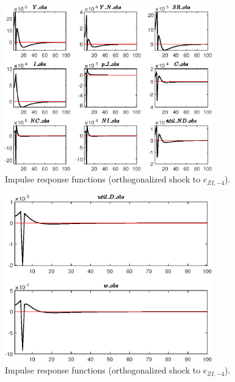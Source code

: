 \begin{figure}[H]
\centering 
\includegraphics[width=0.80\textwidth]{RBC_sectoral/graphs/RBC_sectoral_IRF_e_ZI_news1}
\caption{Impulse response functions (orthogonalized shock to ${e_{ZI,-4}}$).}\label{Fig:IRF:e_ZI_news:1}
\end{figure}
 
\begin{figure}[H]
\centering 
\includegraphics[width=0.80\textwidth]{RBC_sectoral/graphs/RBC_sectoral_IRF_e_ZI_news2}
\caption{Impulse response functions (orthogonalized shock to ${e_{ZI,-4}}$).}\label{Fig:IRF:e_ZI_news:2}
\end{figure}
 
